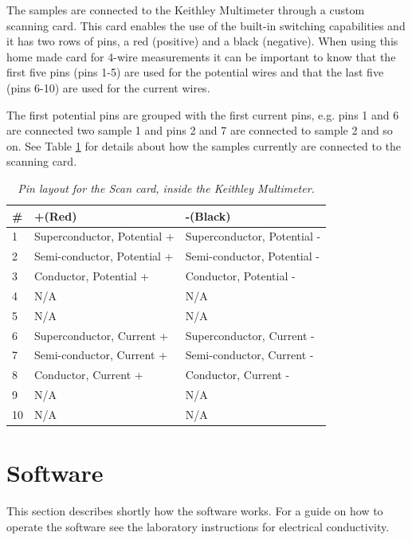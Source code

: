 \documentclass[a4paper,12pt]{article}
\begin{document}
The samples are connected to the Keithley Multimeter through a custom scanning card. This card enables the use of the built-in switching capabilities and it has two rows of pins, a red (positive) and a black (negative). When using this home made card for 4-wire measurements it can be important to know that the first five pins (pins 1-5) are used for the potential wires and that the  last five (pins 6-10) are used for the current wires.

The first potential pins are grouped with the first current pins, e.g. pins 1 and 6 are connected two sample 1 and pins 2 and 7 are connected to sample 2 and so on. See Table \ref{tab:ScanCard} for details about how the samples currently are connected to the scanning card.
 
 
 \begin{table}[H]
	\center
	
	\caption{\emph{Pin layout for the Scan card, inside the Keithley Multimeter.}} 
	\begin{tabular}{l|l|l}
	\label{tab:ScanCard}
		\#  & +(Red) & -(Black) \\
		\hline
		1  & Superconductor, Potential +	& Superconductor, Potential - \\
		2  & Semi-conductor, Potential +		& Semi-conductor, Potential - \\
		3  & Conductor, Potential +			& Conductor, Potential - \\
		4  & 	N/A	& N/A \\
		5  & 	N/A	& N/A \\
		6  & Superconductor, Current +		& Superconductor, Current - \\
		7  & Semi-conductor, Current +		& Semi-conductor, Current - \\
		8  & Conductor, Current +			& Conductor, Current - \\
		9  & 	N/A	& N/A \\
		10 & 	N/A	& N/A \\
	\end{tabular}
	
\end{table}

\section{Software}

This section describes shortly how the software works. For a guide on how to operate the software see the laboratory instructions for electrical conductivity. 
\end{document}
